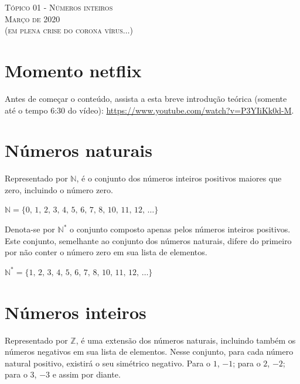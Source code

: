 \documentclass{exam}
\begin{document}
	\begin{center}
\large{\textsc{Tópico 01 - Números inteiros\\
Março de 2020\\ (em plena crise do corona vírus$\ldots$)}}
	\end{center}

	
	\begin{multicols*}{2}
	\setlength{\columnseprule}{1pt}


\tableofcontents

\section{Momento netflix}

Antes de começar o conteúdo, assista a esta breve introdução teórica (somente até o tempo 6:30 do vídeo): \url{https://www.youtube.com/watch?v=P3YIiKk0d-M}.


\section{Números naturais}

Representado por $\mathbb{N}$, é o conjunto dos números inteiros positivos maiores que zero, incluindo o número zero.

\begin{center}
	$\mathbb{N} = \{0,\, 1,\, 2,\, 3,\, 4,\, 5,\, 6,\, 7,\, 8,\, 10,\, 11,\, 12,\, \ldots\}$
\end{center}

Denota-se por $\mathbb{N^*}$ o conjunto composto apenas pelos números inteiros positivos. Este conjunto, semelhante ao conjunto dos números naturais, difere do primeiro por não conter o número zero em sua lista de elementos.

\begin{center}
	$\mathbb{N^*} = \{1,\, 2,\, 3,\, 4,\, 5,\, 6,\, 7,\, 8,\, 10,\, 11,\, 12,\, \ldots\}$	
\end{center}


\section{Números inteiros}

Representado por $\mathbb{Z}$, é uma extensão dos números naturais, incluindo também os números negativos em sua lista de elementos. Nesse conjunto, para cada número natural positivo, existirá o seu simétrico negativo. Para o $1$, $-1$; para o $2$, $-2$; para o $3$, $-3$ e assim por diante.


\end{multicols*}
\end{document}
